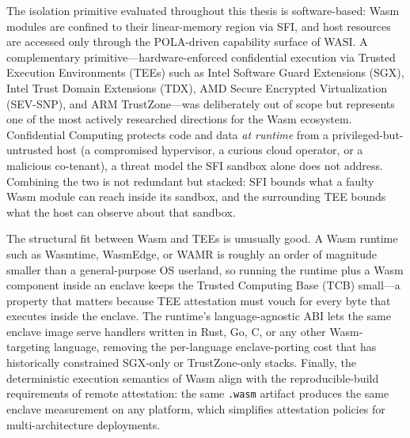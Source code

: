 The isolation primitive evaluated throughout this thesis is software-based: Wasm modules are confined to their linear-memory region via \acs{SFI}, and host resources are accessed only through the \acs{POLA}-driven capability surface of \acs{WASI}. A complementary primitive---hardware-enforced confidential execution via Trusted Execution Environments (\acs{TEE}s) such as Intel Software Guard Extensions (\acs{SGX}), Intel Trust Domain Extensions (\acs{TDX}), AMD Secure Encrypted Virtualization (\acs{SEV}-SNP), and ARM TrustZone---was deliberately out of scope but represents one of the most actively researched directions for the Wasm ecosystem. Confidential Computing protects code and data \emph{at runtime} from a privileged-but-untrusted host (a compromised hypervisor, a curious cloud operator, or a malicious co-tenant), a threat model the \acs{SFI} sandbox alone does not address. Combining the two is not redundant but stacked: \acs{SFI} bounds what a faulty Wasm module can reach inside its sandbox, and the surrounding \acs{TEE} bounds what the host can observe about that sandbox.

\begin{sloppypar}
The structural fit between Wasm and \acs{TEE}s is unusually good. A Wasm runtime such as Wasmtime, WasmEdge, or \acs{WAMR} is roughly an order of magnitude smaller than a general-purpose \acs{OS} userland, so running the runtime plus a Wasm component inside an enclave keeps the Trusted Computing Base (\acs{TCB}) small---a property that matters because \acs{TEE} attestation must vouch for every byte that executes inside the enclave. The runtime's language-agnostic \acs{ABI} lets the same enclave image serve handlers written in Rust, Go, C, or any other Wasm-targeting language, removing the per-language enclave-porting cost that has historically constrained \acs{SGX}-only or TrustZone-only stacks. Finally, the deterministic execution semantics of Wasm align with the reproducible-build requirements of remote attestation: the same \texttt{.wasm} artifact produces the same enclave measurement on any platform, which simplifies attestation policies for multi-architecture deployments.
\end{sloppypar}

